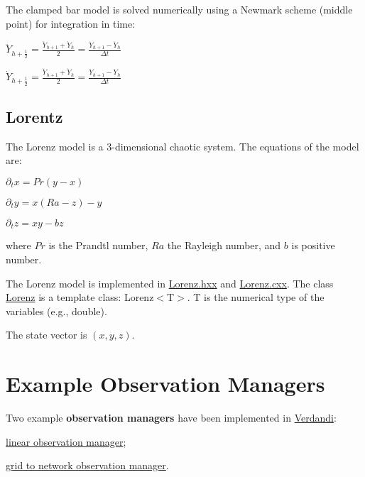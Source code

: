 \documentclass{tufte-book}
\begin{document}
The clamped bar model is solved numerically using a Newmark scheme (middle point) for integration in time:

$ \ddot Y_{h + \frac{1}{2}} = \frac{\ddot Y_{h+1} + \ddot Y_{h} }2 = \frac{\dot Y_{h+1} - \dot Y_{h} } {\Delta t} $ \par
 $ \dot Y_{h + \frac{1}{2}} = \frac{\dot Y_{h+1} + \dot Y_{h} }2 = \frac{Y_{h+1} - Y_{h} } {\Delta t} $ \par



\hypertarget{lorentz}{}\subsection{Lorentz}\label{lorentz}

\-The \-Lorenz model is a 3-\/dimensional chaotic system. \-The equations of the model are\-:

\begin{center} $\partial_tx = Pr (y - x)$\par
 $\partial_ty = x (Ra - z) -y$ \par
 $\partial_tz = xy - b z$ \par
 \end{center}

where $Pr$ is the \-Prandtl number, $Ra$ the \-Rayleigh number, and $b$ is positive number.

\-The \-Lorenz model is implemented in {\ttfamily \hyperlink{_lorenz_8hxx_source}{\-Lorenz.\-hxx}} and {\ttfamily \hyperlink{_lorenz_8cxx_source}{\-Lorenz.\-cxx}}. \-The class {\ttfamily  \hyperlink{class_verdandi_1_1_lorenz}{\-Lorenz}} is a template class\-: {\ttfamily \-Lorenz$<$\-T$>$}. {\ttfamily \-T} is the numerical type of the variables (e.\-g., {\ttfamily double}).

\-The state vector is $(x, y, z)$.


\hypertarget{observations}{}\section{Example Observation Managers}\label{observations}


\-Two example {\bfseries observation managers} have been implemented in \hyperlink{namespace_verdandi}{\-Verdandi}\-:


\begin{DoxyItemize}
\item \hyperlink{linear_observation_manager}{linear observation manager};
\item \hyperlink{grid_to_network_observation_manager}{grid to network observation manager}.
\end{DoxyItemize}
\end{document}
